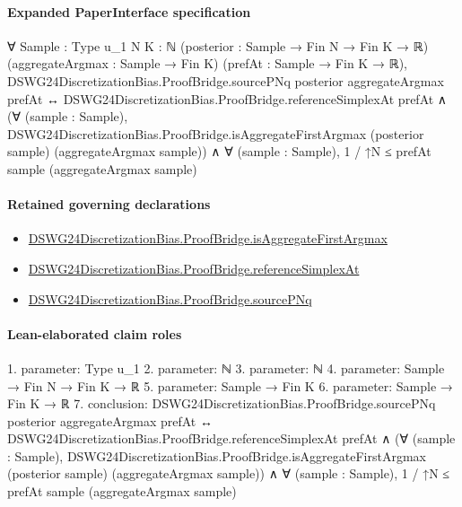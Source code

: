 \documentclass[10pt]{article}
\begin{document}
\paragraph{Expanded PaperInterface specification}
\begin{ReviewVerbatim}
∀ {Sample : Type u_1} {N K : ℕ} (posterior : Sample → Fin N → Fin K → ℝ) (aggregateArgmax : Sample → Fin K)
  (prefAt : Sample → Fin K → ℝ),
  DSWG24DiscretizationBias.ProofBridge.sourcePNq posterior aggregateArgmax prefAt ↔
    DSWG24DiscretizationBias.ProofBridge.referenceSimplexAt prefAt ∧
      (∀ (sample : Sample),
          DSWG24DiscretizationBias.ProofBridge.isAggregateFirstArgmax (posterior sample) (aggregateArgmax sample)) ∧
        ∀ (sample : Sample), 1 / ↑N ≤ prefAt sample (aggregateArgmax sample)
\end{ReviewVerbatim}

\paragraph{Retained governing declarations}
\begin{itemize}\raggedright
\item \hyperlink{paper-prerequisite-46e579d6fcd53814}{DSWG24\allowbreak{}Discretization\allowbreak{}Bias.\allowbreak{}Proof\allowbreak{}Bridge.\allowbreak{}is\allowbreak{}Aggregate\allowbreak{}First\allowbreak{}Argmax}
\item \hyperlink{paper-prerequisite-e9ff5dcccf634407}{DSWG24\allowbreak{}Discretization\allowbreak{}Bias.\allowbreak{}Proof\allowbreak{}Bridge.\allowbreak{}reference\allowbreak{}Simplex\allowbreak{}At}
\item \hyperlink{governing-declaration-9631b3d6800a2bd3}{DSWG24\allowbreak{}Discretization\allowbreak{}Bias.\allowbreak{}Proof\allowbreak{}Bridge.\allowbreak{}source\allowbreak{}P\allowbreak{}Nq}
\end{itemize}
\paragraph{Lean-elaborated claim roles}\begin{ReviewVerbatim}
1. parameter: Type u_1
2. parameter: ℕ
3. parameter: ℕ
4. parameter: Sample → Fin N → Fin K → ℝ
5. parameter: Sample → Fin K
6. parameter: Sample → Fin K → ℝ
7. conclusion: DSWG24DiscretizationBias.ProofBridge.sourcePNq posterior aggregateArgmax prefAt ↔
  DSWG24DiscretizationBias.ProofBridge.referenceSimplexAt prefAt ∧
    (∀ (sample : Sample),
        DSWG24DiscretizationBias.ProofBridge.isAggregateFirstArgmax (posterior sample) (aggregateArgmax sample)) ∧
      ∀ (sample : Sample), 1 / ↑N ≤ prefAt sample (aggregateArgmax sample)
\end{ReviewVerbatim}
\end{document}
